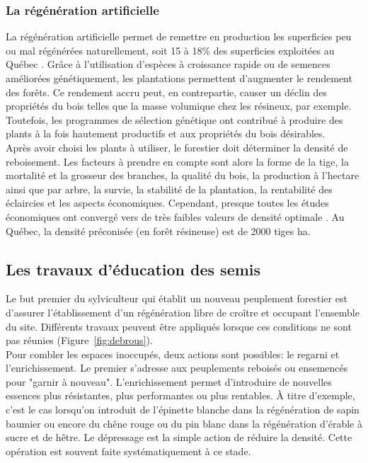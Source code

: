 \subsubsection{La régénération artificielle}

La régénération artificielle permet de remettre en production les superficies peu ou mal régénérées naturellement, soit 15 à 18\% des superficies exploitées au Québec \citep{thiffault2003sylviculture}. Grâce à l'utilisation d'espèces à croissance rapide ou de semences améliorées génétiquement, les plantations permettent d'augmenter le rendement des forêts. Ce rendement accru peut, en contrepartie, causer un déclin des propriétés du bois telles que la masse volumique chez les résineux, par exemple. Toutefois, les programmes de sélection génétique ont contribué à produire des plants à la fois hautement productifs et aux propriétés du bois désirables.\\

Après avoir choisi les plants à utiliser, le forestier doit déterminer la densité de reboisement. Les facteurs à prendre en compte sont alors la forme de la tige, la mortalité et la grosseur des branches, la qualité du bois, la production à l'hectare ainsi que par arbre, la survie, la stabilité de la plantation, la rentabilité des éclaircies et les aspects économiques. Cependant, presque toutes les études économiques ont convergé vers de très faibles valeurs de densité optimale \citep{thiffault2003sylviculture}. Au Québec, la densité préconisée (en forêt résineuse) est de 2000 tiges ha.\\

\subsection{Les travaux d'éducation des semis}

Le but premier du sylviculteur qui établit un nouveau peuplement forestier est d'assurer l'établissement d'un régénération libre de croître et occupant l'ensemble du site. Différents travaux peuvent être appliqués lorsque ces conditions ne sont pas réunies (Figure~\ref{fig:debrous}).\\

Pour combler les espaces inoccupés, deux actions sont possibles: le regarni et l'enrichissement. Le premier s'adresse aux peuplements reboisés ou ensemencés pour "garnir à nouveau". L'enrichissement permet d'introduire de nouvelles essences plus résistantes, plus performantes ou plus rentables. À titre d'exemple, c'est le cas lorsqu'on introduit de l'épinette blanche dans la régénération de sapin baumier ou encore du chêne rouge ou du pin blanc dans la régénération d'érable à sucre et de hêtre. Le dépressage est la simple action de réduire la densité. Cette opération est souvent faite systématiquement à ce stade. 


